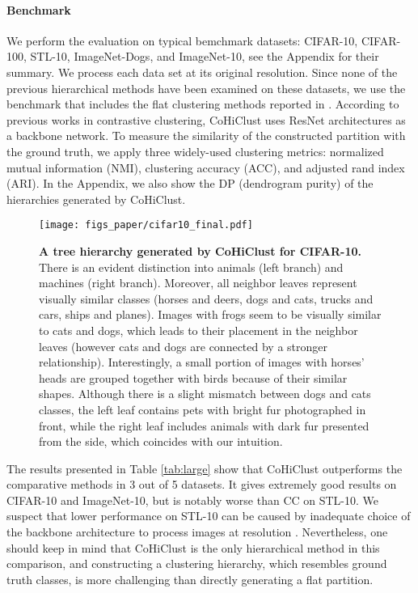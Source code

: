 \documentclass[runningheads]{llncs}
\def\our{CoHiClust}
\begin{document}
\paragraph{Benchmark} We perform the evaluation on typical bemchmark datasets: CIFAR-10, CIFAR-100, STL-10, ImageNet-Dogs, and ImageNet-10, see the Appendix for their summary. We process each data set at its original resolution. Since none of the previous hierarchical methods have been examined on these datasets, we use the benchmark that includes the flat clustering methods reported in \cite{Li2021contrastive_clustering}. According to previous works in contrastive clustering, \our{} uses ResNet architectures as a backbone network. To measure the similarity of the constructed partition with the ground truth, we apply three widely-used clustering metrics: normalized mutual information (NMI), clustering accuracy (ACC), and adjusted rand index (ARI). In the Appendix, we also show the DP (dendrogram purity) of the hierarchies generated by \our{}.

\begin{figure}[!htb]
    \centering
    \texttt{[image: figs\_paper/cifar10\_final.pdf]}
    \caption{{\bf A tree hierarchy generated by \our{} for CIFAR-10.} There is an evident distinction into animals (left branch) and machines (right branch). Moreover, all neighbor leaves represent visually similar classes (horses and deers, dogs and cats, trucks and cars, ships and planes). Images with frogs seem to be visually similar to cats and dogs, which leads to their placement in the neighbor leaves (however cats and dogs are connected by a stronger relationship). Interestingly, a small portion of images with horses' heads are grouped together with birds because of their similar shapes. Although there is a slight mismatch between dogs and cats classes, the left leaf contains pets with bright fur photographed in front, while the right leaf includes animals with dark fur presented from the side, which coincides with our intuition. }
    \label{fig:cifar}
\end{figure}



The results presented in Table \ref{tab:large} show that \our{} outperforms the comparative methods in 3 out of 5 datasets. It gives extremely good results on CIFAR-10 and ImageNet-10, but is notably worse than CC on STL-10. We suspect that lower performance on STL-10 can be caused by inadequate choice of the backbone architecture to process images at resolution . Nevertheless, one should keep in mind that \our{} is the only hierarchical method in this comparison, and constructing a clustering hierarchy, which resembles ground truth classes, is more challenging than directly generating a flat partition.
\end{document}
